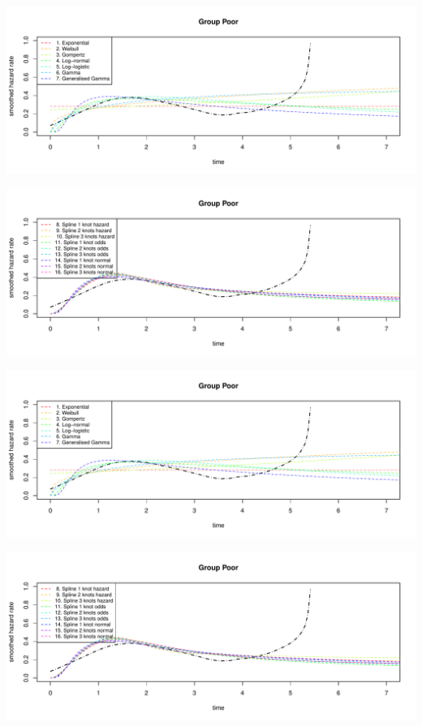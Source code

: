 \documentclass[
]{article}
\begin{document}
\begin{flushleft}\includegraphics[height=0.29\textheight]{Images/plot_haz_pred-5} \end{flushleft}

\begin{flushleft}\includegraphics[height=0.29\textheight]{Images/plot_haz_pred-6} \end{flushleft}

\begin{flushleft}\includegraphics[height=0.29\textheight]{Images/plot_haz_pred-7} \end{flushleft}

\begin{flushleft}\includegraphics[height=0.29\textheight]{Images/plot_haz_pred-8} \end{flushleft}
\end{document}
